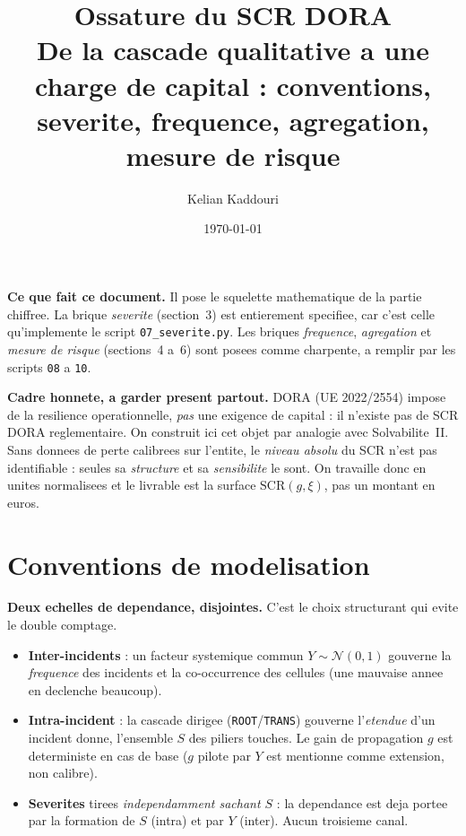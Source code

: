 \documentclass[11pt,a4paper]{article}
\title{\vspace{-1.2cm}\color{navy}\bfseries Ossature du SCR DORA\\[2pt]
  \large De la cascade qualitative a une charge de capital : conventions,
  severite, frequence, agregation, mesure de risque}
\author{Kelian Kaddouri}
\date{\today}
\begin{document}
\maketitle
\vspace{-0.5cm}

\begin{cle}
\textbf{Ce que fait ce document.} Il pose le squelette mathematique de la partie
chiffree. La brique \emph{severite} (section~3) est entierement specifiee, car
c'est celle qu'implemente le script \texttt{07\_severite.py}. Les briques
\emph{frequence}, \emph{agregation} et \emph{mesure de risque} (sections~4 a~6)
sont posees comme charpente, a remplir par les scripts \texttt{08} a \texttt{10}.
\end{cle}

\begin{attention}
\textbf{Cadre honnete, a garder present partout.} DORA (UE 2022/2554) impose de la
resilience operationnelle, \emph{pas} une exigence de capital : il n'existe pas de
SCR DORA reglementaire. On construit ici cet objet par analogie avec Solvabilite~II.
Sans donnees de perte calibrees sur l'entite, le \emph{niveau absolu} du SCR n'est
pas identifiable : seules sa \emph{structure} et sa \emph{sensibilite} le sont. On
travaille donc en unites normalisees et le livrable est la surface $\mathrm{SCR}(g,\xi)$,
pas un montant en euros.
\end{attention}

\section{Conventions de modelisation}

\begin{apport}
\textbf{Deux echelles de dependance, disjointes.} C'est le choix structurant qui
evite le double comptage.
\begin{itemize}[leftmargin=1.4em,itemsep=1pt,topsep=2pt]
  \item \textbf{Inter-incidents} : un facteur systemique commun $Y\sim\mathcal N(0,1)$
        gouverne la \emph{frequence} des incidents et la co-occurrence des cellules
        (une mauvaise annee en declenche beaucoup).
  \item \textbf{Intra-incident} : la cascade dirigee (\texttt{ROOT}/\texttt{TRANS})
        gouverne l'\emph{etendue} d'un incident donne, l'ensemble $S$ des piliers
        touches. Le gain de propagation $g$ est deterministe en cas de base ($g$
        pilote par $Y$ est mentionne comme extension, non calibre).
  \item \textbf{Severites} tirees \emph{independamment sachant $S$} : la dependance
        est deja portee par la formation de $S$ (intra) et par $Y$ (inter). Aucun
        troisieme canal.
\end{itemize}
\end{apport}
\end{document}
